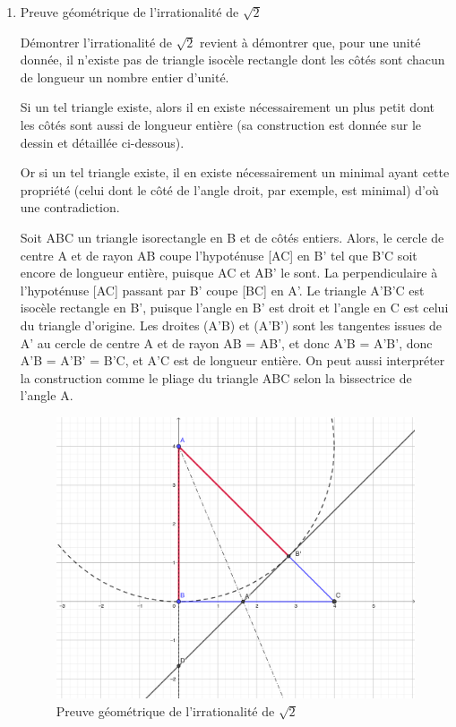 \documentclass[a4paper,11pt]{book}
\begin{document}
\begin{enumerate}
\clearpage

\item Preuve géométrique de l'irrationalité de \(\sqrt{2}\)
\label{sec:orge68d7ab}
\label{orgfeda53b}
\label{page:sqrt2proof2geometric-proof}

Démontrer l'irrationalité de
\(\sqrt{2}\) revient à démontrer que, pour une unité
donnée, il n'existe pas de triangle isocèle rectangle dont les côtés
sont chacun de longueur un nombre
entier d'unité.


Si un tel triangle existe, alors il en existe nécessairement un
plus petit dont les côtés sont aussi de longueur entière (sa
construction est donnée sur le dessin et détaillée
ci-dessous).

Or si un tel triangle existe, il en existe nécessairement un minimal
ayant cette propriété (celui dont le côté de l'angle droit, par
exemple, est minimal) d'où une
contradiction.


Soit ABC un triangle isorectangle en B et de côtés
entiers. Alors, le cercle de centre A et de rayon AB coupe
l'hypoténuse [AC] en B' tel que B'C soit encore de longueur
entière, puisque AC et AB' le sont. La perpendiculaire à
l'hypoténuse [AC] passant par B' coupe [BC] en A'. Le triangle
A'B'C est isocèle rectangle en B', puisque l'angle en B' est droit
et l'angle en C est celui du triangle d'origine. Les droites
(A'B) et (A'B') sont les tangentes issues de A' au cercle de
centre A et de rayon AB = AB', et donc A'B = A'B', donc A'B =
A'B' = B'C, et A'C est de longueur entière. On peut aussi
interpréter la construction comme le pliage du triangle ABC selon
la bissectrice de l'angle A.



\begin{figure}[htbp]
\centering
\includegraphics[width=.9\linewidth]{./manip_real/img/isorectangle-sqrt2-png.png}
\caption{Preuve géométrique de l'irrationalité de \(\sqrt{2}\)}
\end{figure}


\end{enumerate}
\end{document}
